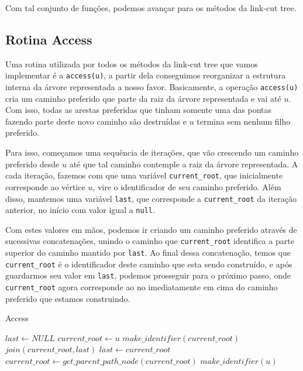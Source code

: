 Com tal conjunto de funções, podemos avançar para os métodos da link-cut tree.

\subsection{Rotina Access}
\label{subsection:lct-access}

Uma rotina utilizada por todos os métodos da link-cut tree que vamos implementar é a \texttt{access(u)}, a partir dela conseguimos reorganizar a estrutura interna da árvore representada a nosso favor. Basicamente, a operação \texttt{access(u)} cria um caminho preferido que parte da raiz da árvore representada e vai até $u$. Com isso, todas as arestas preferidas que tinham somente uma das pontas fazendo parte deste novo caminho são destruídas e $u$ termina sem nenhum filho preferido.

Para isso, começamos uma sequência de iterações, que vão crescendo um caminho preferido desde $u$ até que tal caminho contemple a raiz da árvore representada. A cada iteração, fazemos com que uma variável \texttt{current\_root}, que inicialmente corresponde ao vértice $u$, vire o identificador de seu caminho preferido. Além disso, mantemos uma variável \texttt{last}, que corresponde a \texttt{current\_root} da iteração anterior, no início com valor igual a \texttt{null}.

Com estes valores em mãos, podemos ir criando um caminho preferido através de sucessivas concatenações, unindo o caminho que \texttt{current\_root} identifica a parte superior do caminho mantido por \texttt{last}. Ao final dessa concatenação, temos que \texttt{current\_root} é o identificador deste caminho que esta sendo construído, e após guardarmos seu valor em \texttt{last}, podemos prosseguir para o próximo passo, onde \texttt{current\_root} agora corresponde ao no imediatamente em cima do caminho preferido que estamos construindo.

\begin{algorithm}[h!]
    \caption{Access}\label{lct:access}
    \begin{algorithmic}
        \State $last \gets NULL$
        \State $current\_root \gets u$
        \State {}
        \State $make\_identifier(current\_root)$
        \State {}
        \State $join(current\_root, last)$
        \State $last \gets current\_root$
        \State $current\_root \gets get\_parent\_path\_node(current\_root)$
        \State $make\_identifier(u)$
        \EndWhile
        \EndFunction
    \end{algorithmic}
\end{algorithm}

